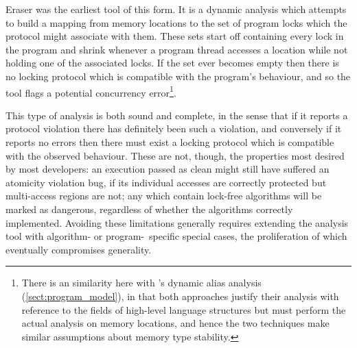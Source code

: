 Eraser\cite{Savage1997} was the earliest tool of this form.  It is a
dynamic analysis which attempts to build a mapping from memory
locations to the set of program locks which the protocol might
associate with them.  These sets start off containing every lock in
the program and shrink whenever a program thread accesses a location
while not holding one of the associated locks.  If the set ever
becomes empty then there is no locking protocol which is compatible
with the program's behaviour, and so the tool flags a potential
concurrency error\footnote{There is an similarity here with
  {\technique}'s dynamic alias analysis
  (\autoref{sect:program_model}), in that both approaches justify
  their analysis with reference to the fields of high-level language
  structures but must perform the actual analysis on memory locations,
  and hence the two techniques make similar assumptions about memory
  type stability.}.


This type of analysis is both sound and complete, in the sense that if
it reports a protocol violation there has definitely been such a
violation, and conversely if it reports no errors then there must
exist a locking protocol which is compatible with the observed
behaviour.  These are not, though, the properties most desired by most
developers: an execution passed as clean might still have suffered an
atomicity violation bug, if its individual accesses are correctly
protected but multi-access regions are not; any which contain
lock-free algorithms will be marked as dangerous, regardless of
whether the algorithms correctly implemented.  Avoiding these
limitations generally requires extending the analysis tool with
algorithm- or program-~specific special cases, the proliferation of
which eventually compromises generality.

